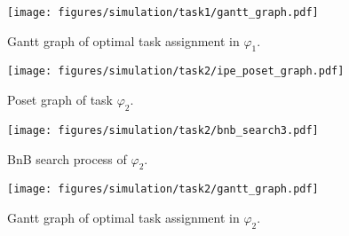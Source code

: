 \begin{figure}[htbp]
		\centering
\texttt{[image: figures/simulation/task1/gantt\_graph.pdf]}
\caption{Gantt graph of optimal task assignment in $\varphi_1$.}
\label{fig:gantt_task1}
\end{figure}


\begin{figure}[htbp]
		\centering%
\texttt{[image: figures/simulation/task2/ipe\_poset\_graph.pdf]}
\caption{Poset graph of task $\varphi_2$.}
\label{fig:poset_graph2}
\end{figure}

\begin{figure}[htbp]
		\centering
\texttt{[image: figures/simulation/task2/bnb\_search3.pdf]}
\caption{ BnB search process of $\varphi_2$.}
\label{fig:hesse_task2}
\end{figure}

\begin{figure}[htbp]
		\centering
\texttt{[image: figures/simulation/task2/gantt\_graph.pdf]}
\caption{Gantt graph of optimal task assignment in $\varphi_2$.}
\label{fig:gantt_task2}
\end{figure}

